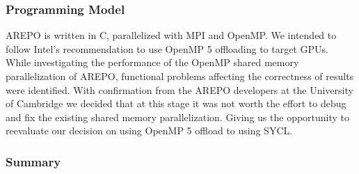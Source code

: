 \documentclass[../main]{subfiles}
\begin{document}
\subsubsection{Programming Model}
AREPO is written in C, parallelized with MPI and OpenMP. We intended to follow Intel’s recommendation to use OpenMP 5 offloading to target GPUs. While investigating the performance of the OpenMP shared memory parallelization of AREPO, functional problems affecting the correctness of results were identified. With confirmation from the AREPO developers at the University of Cambridge we decided that at this stage it was not worth the effort to debug and fix the existing shared memory parallelization. Giving us the opportunity to reevaluate our decision on using OpenMP 5 offload to using SYCL. 

\subsubsection{Summary}



\end{document}
